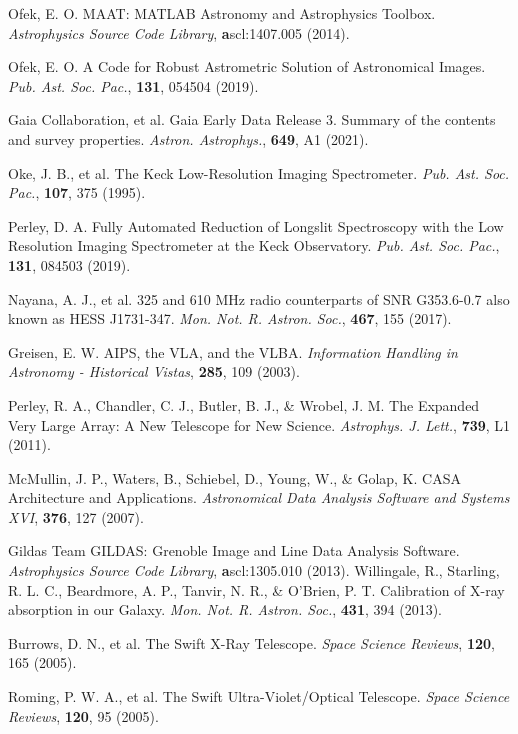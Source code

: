 \documentclass{nature_plusfigure}
\newcommand{\mn}{{Mon. Not. R. Astron. Soc.}}
\newcommand{\mnras}{\mn}
\newcommand{\apjl}{{Astrophys. J. Lett.}}
\newcommand{\aap}{{Astron. Astrophys.}}
\newcommand{\pasp}{{Pub. Ast. Soc. Pac.}}
\newcommand{\ssr}{Space Science Reviews}
\begin{document}
\begin{methods}
\begin{thebibliography}{10}
 Ofek, E. O. MAAT: MATLAB Astronomy and Astrophysics Toolbox. \emph{Astrophysics Source Code Library}, \textbf ascl:1407.005 (2014). 

 Ofek, E. O. A Code for Robust Astrometric Solution of Astronomical Images. \emph{\pasp}, \textbf{131}, 054504 (2019). 

  Gaia Collaboration, et al. Gaia Early Data Release 3. Summary of the contents and survey properties. \emph{\aap}, \textbf{649}, A1 (2021). 


 Oke, J. B., et al. The Keck Low-Resolution Imaging Spectrometer. \emph{\pasp}, \textbf{107}, 375 (1995). 
 
 Perley, D. A. Fully Automated Reduction of Longslit Spectroscopy with the Low Resolution Imaging Spectrometer at the Keck Observatory. \emph{\pasp}, \textbf{131}, 084503 (2019). 


 Nayana, A. J., et al. 325 and 610 MHz radio counterparts of SNR G353.6-0.7 also known as HESS J1731-347. \emph{\mnras}, \textbf{467}, 155 (2017). 

 Greisen, E. W. AIPS, the VLA, and the VLBA. \emph{Information Handling in Astronomy - Historical Vistas}, \textbf{285}, 109 (2003). 

 Perley, R. A., Chandler, C. J., Butler, B. J., \& Wrobel, J. M. The Expanded Very Large Array: A New Telescope for New Science. \emph{\apjl}, \textbf{739}, L1 (2011). 

 McMullin, J. P., Waters, B., Schiebel, D., Young, W., \& Golap, K. CASA Architecture and Applications. \emph{Astronomical Data Analysis Software and Systems XVI}, \textbf{376}, 127 (2007). 

 Gildas Team GILDAS: Grenoble Image and Line Data Analysis Software. \emph{Astrophysics Source Code Library}, \textbf ascl:1305.010 (2013). 
 Willingale, R., Starling, R. L. C., Beardmore, A. P., Tanvir, N. R., \& O'Brien, P. T. Calibration of X-ray absorption in our Galaxy. \emph{\mnras}, \textbf{431}, 394 (2013). 


 Burrows, D. N., et al. The Swift X-Ray Telescope. \emph{\ssr}, \textbf{120}, 165 (2005). 

 Roming, P. W. A., et al. The Swift Ultra-Violet/Optical Telescope. \emph{\ssr}, \textbf{120}, 95 (2005).


\end{thebibliography}
\end{methods}
\end{document}
